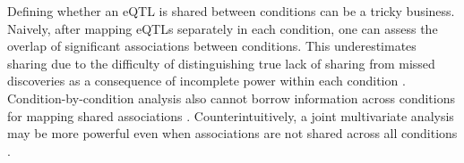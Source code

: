 Defining whether an \gls{eQTL} is shared between conditions can be a tricky business.
Naively, after mapping \glspl{eQTL} separately in each condition, one can assess the overlap of significant associations between conditions.
This underestimates sharing due to the difficulty of distinguishing true lack of sharing from missed discoveries as a consequence of incomplete power within each condition \autocite{flutre2013StatisticalFrameworkJoint,peters2016InsightGenotypePhenotypeAssociations}.
Condition-by-condition analysis also cannot borrow information across conditions for mapping shared associations \autocite{flutre2013StatisticalFrameworkJoint,urbut2018FlexibleStatisticalMethods,li2018HTeQTLIntegrativeExpression}.
Counterintuitively, a joint multivariate analysis may be more powerful even when associations are not shared across all conditions \autocite{stephens2013UnifiedFrameworkAssociation}.

